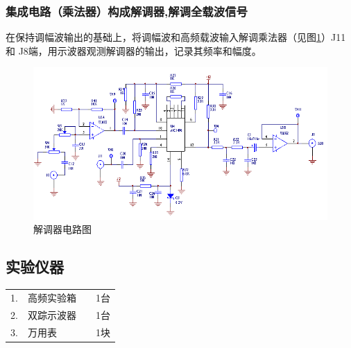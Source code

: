 \documentclass[12pt]{article}%
\numberwithin{equation}{section}
\begin{document}
\subsubsection{集成电路（乘法器）构成解调器,解调全载波信号}
在保持调幅波输出的基础上，将调幅波和高频载波输入解调乘法器（见图\ref{img:jAM}）J11和 J8端，用示波器观测解调器的输出，记录其频率和幅度。
       \begin{figure}[htbp]
  \centering
  \includegraphics[width=\textwidth]{image020.png} 
  \caption{解调器电路图 } 
  \label{img:jAM} 
\end{figure}

\subsection{实验仪器}
\begin{tabular}{clcc}
1.&	高频实验箱                &&        1台 \\
2.&	双踪示波器           &&             1台\\
3.&	万用表           &&             1块\\
\end{tabular}
\end{document}

